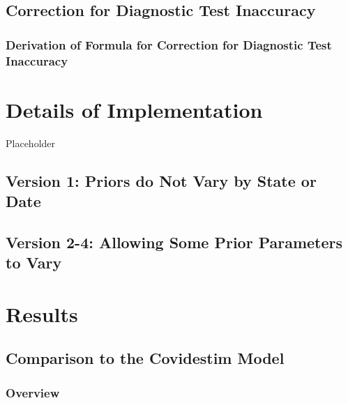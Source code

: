\documentclass[12pt,twoside]{smiththesis}
\begin{document}
\hypertarget{correct-test-inaccuracy}{%
\section{Correction for Diagnostic Test Inaccuracy}\label{correct-test-inaccuracy}}

\hypertarget{derivation-of-formula-for-correction-for-diagnostic-test-inaccuracy}{%
\subsection{Derivation of Formula for Correction for Diagnostic Test Inaccuracy}\label{derivation-of-formula-for-correction-for-diagnostic-test-inaccuracy}}

\hypertarget{details-of-implementation}{%
\chapter{Details of Implementation}\label{details-of-implementation}}

Placeholder

\hypertarget{version-1-priors-do-not-vary-by-state-or-date}{%
\section{Version 1: Priors do Not Vary by State or Date}\label{version-1-priors-do-not-vary-by-state-or-date}}

\hypertarget{version-2-4-allowing-some-prior-parameters-to-vary}{%
\section{Version 2-4: Allowing Some Prior Parameters to Vary}\label{version-2-4-allowing-some-prior-parameters-to-vary}}

\hypertarget{res}{%
\chapter{Results}\label{res}}

\hypertarget{comparison-to-the-covidestim-model}{%
\section{Comparison to the Covidestim Model}\label{comparison-to-the-covidestim-model}}

\hypertarget{overview-2}{%
\subsection{Overview}\label{overview-2}}
\end{document}
